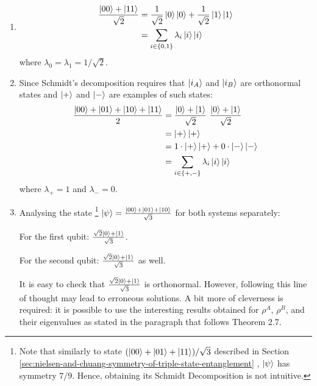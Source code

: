 \begin{enumerate}
    \item \begin{align}
            \frac{\ket{00} + \ket{11}}{\sqrt2} &= \frac{1}{\sqrt2} \ket{0} \ket{0} +
                \frac{1}{\sqrt2} \ket{1} \ket{1} \\
            &= \sum_{i \in \{0, 1\}} \lambda_i \ket{i} \ket{i}
        \end{align}
        where $\lambda_0 = \lambda_1 = 1 / \sqrt{2}$.
    
    \item Since Schmidt's decomposition requires that $\ket{i_A}$ and $\ket{i_B}$ are
        orthonormal states and $\ket{+}$ and $\ket{-}$ are examples of such states:
        \begin{align}
            \frac{\ket{00} + \ket{01} + \ket{10} + \ket{11}}{2} &=
                \frac{\ket{0} + \ket{1}}{\sqrt2}\ \frac{\ket{0} + \ket{1}}{\sqrt2} \\
            &= \ket{+} \ket{+} \\
            &= 1 \cdot \ket{+} \ket{+} + 0 \cdot \ket{-} \ket{-} \\
            &= \sum_{i \in \{+, -\}} \lambda_i \ket{i} \ket{i}
        \end{align}
        where $\lambda_+ = 1$ and $\lambda_- = 0$.
        
    \item Analysing the state
        \footnote{Note that similarly to state $(\ket{00} + \ket{01} + \ket{11})/\sqrt{3}$
            described in Section
            \ref{sec:nielsen-and-chuang-symmetry-of-triple-state-entanglement}
        , $\ket{\psi}$ has symmetry $7/9$.
        Hence, obtaining its Schmidt Decomposition is not intuitive.}
        $\ket{\psi} = \frac{\ket{00} + \ket{01} + \ket{10}}{\sqrt3}$
        for both systems separately:
        
        For the first qubit: $\frac{\sqrt2 \ket{0} + \ket{1}}{\sqrt3}$.
        
        For the second qubit: $\frac{\sqrt2 \ket{0} + \ket{1}}{\sqrt3}$
        as well.
        
        It is easy to check that $\frac{\sqrt2 \ket{0} + \ket{1}}{\sqrt3}$ is        orthonormal.
        However, following this line of thought may lead to erroneous solutions.
        A bit more of cleverness is required:
        it is possible to use the interesting results obtained for
        $\rho^A$, $\rho^B$, and their eigenvalues as stated in the paragraph
        that follows Theorem 2.7.
        

\end{enumerate}
